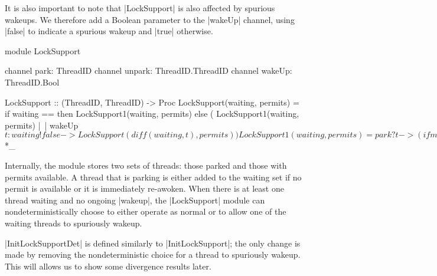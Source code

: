 It is also important to note that |LockSupport| is also affected by spurious wakeups. We therefore add a Boolean parameter to the |wakeUp| channel, using |false| to indicate a spurious wakeup and |true| otherwise.

\begin{cspm}[caption={The CSP model of the Java LockSupport module}]
  module LockSupport

    channel park: ThreadID
    channel unpark: ThreadID.ThreadID
    channel wakeUp: ThreadID.Bool

    LockSupport :: ({ThreadID}, {ThreadID}) -> Proc
    LockSupport(waiting, permits) =
      if waiting == {} then LockSupport1(waiting, permits)
      else (    LockSupport1(waiting, permits)
            |~| wakeUp$t:waiting!false -> LockSupport(diff(waiting, {t}), permits))

    LockSupport1(waiting, permits) =
      park?t-> (
        if member(t, permits)
          then wakeUp.t.true -> LockSupport(waiting, diff(permits, {t}))
        else LockSupport(union(waiting, {t}), permits) )
      []
      unpark?t?t2-> ( 
        if member(t2, waiting)
          then wakeUp.t2.true -> LockSupport(diff(waiting, {t2}), permits)
        else LockSupport(waiting, union(permits, {t2})))
    

    LockSupportDet :: ({ThreadID}, {ThreadID}) -> Proc
    LockSupportDet(waiting, permits) = LockSupportDet1(waiting, permits)
    LockSupportDet1(waiting, permits) = ... -- Analogous to LockSupport1

  exports

    InitLockSupport = LockSupport({}, {})

    InitLockSupportDet = LockSupportDet({}, {})

    Park(t) = park.t -> wakeUp.t?_ ->  SKIP

    Unpark(t, t') = unpark.t.t' -> SKIP


  endmodule _*$*_
\end{cspm}

Internally, the module stores two sets of threads: those parked and those with permits available. A thread that is parking is either added to the waiting set if no permit is available or it is immediately re-awoken. When there is at least one thread waiting and no ongoing |wakeup|, the |LockSupport| module can nondeterministically choose to either operate as normal or to allow one of the waiting threads to spuriously wakeup.

|InitLockSupportDet| is defined similarly to |InitLockSupport|; the only change is made by removing the nondeterministic choice for a thread to spuriously wakeup. This will allows us to show some divergence results later.

